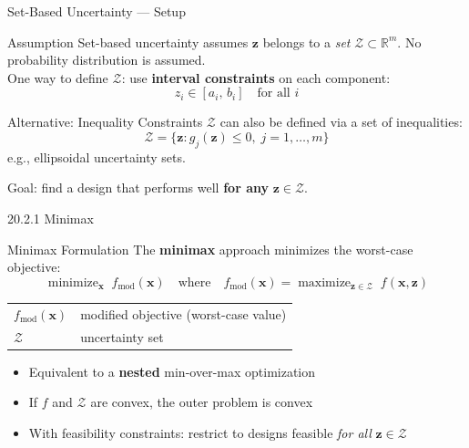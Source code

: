 \documentclass[aspectratio=169,10pt]{beamer}
\newcommand{\x}{\mathbf{x}}
\newcommand{\z}{\mathbf{z}}
\newcommand{\R}{\mathbb{R}}
\newcommand{\Z}{\mathcal{Z}}
\DeclareMathOperator*{\minimize}{minimize}
\DeclareMathOperator*{\maximize}{maximize}
\begin{document}
\begin{frame}{Set-Based Uncertainty — Setup}
  \begin{block}{Assumption}
    Set-based uncertainty assumes $\z$ belongs to a \emph{set} $\Z \subset \R^m$.
    No probability distribution is assumed.\\[4pt]
    One way to define $\Z$: use \textbf{interval constraints} on each component:
    \[
      z_i \in [a_i,\, b_i] \quad \text{for all } i
    \]
  \end{block}
  \vspace{4pt}
  \begin{block}{Alternative: Inequality Constraints}
    $\Z$ can also be defined via a set of inequalities:
    \[
      \Z = \{\z : g_j(\z) \leq 0,\; j = 1,\dots,m\}
    \]
    e.g., ellipsoidal uncertainty sets.
  \end{block}
  \vspace{4pt}
  Goal: find a design that performs well \textbf{for any} $\z \in \Z$.
\end{frame}

\begin{frame}{20.2.1 \; Minimax}
  \begin{block}{Minimax Formulation}
    The \textbf{minimax} approach minimizes the worst-case objective:
    \[
      \boxed{\minimize_{\x} \; f_{\mathrm{mod}}(\x)
        \quad \text{where} \quad
        f_{\mathrm{mod}}(\x) = \maximize_{\z \in \Z}\; f(\x, \z)}
    \]
    \smallskip
    \begin{tabular}{ll}
      $f_{\mathrm{mod}}(\x)$ & modified objective (worst-case value)\\
      $\Z$                   & uncertainty set\\
    \end{tabular}
  \end{block}
  \begin{itemize}
    \item Equivalent to a \textbf{nested} min-over-max optimization
    \item If $f$ and $\Z$ are convex, the outer problem is convex
    \item With feasibility constraints: restrict to designs feasible \emph{for all} $\z \in \Z$
  \end{itemize}
\end{frame}
\end{document}
